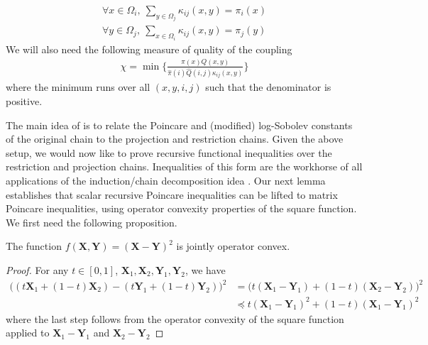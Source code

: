 \begin{align*}
  \forall x \in \Omega_i, \ \sum\limits_{y \in \Omega_j}\kappa_{ij}(x,y) = \pi_i(x)\\
  \forall y \in \Omega_j, \ \sum\limits_{x \in \Omega_i}\kappa_{ij}(x,y) = \pi_j(y)
\end{align*}
We will also need the following measure of quality of the coupling
\begin{align*}
  \chi = \min\bigg\{\frac{\pi(x)Q(x,y)}{\hat{\pi}(i)\hat{Q}(i,j)\kappa_{ij}(x,y)}\bigg\}
\end{align*}
where the minimum runs over all $(x,y,i,j)$ such that the denominator is positive.

The main idea of \cite{JSTV04} is to relate the Poincare and (modified) log-Sobolev constants of the original chain to the projection and restriction chains. Given the above setup, we would now like to prove recursive functional inequalities over the restriction and projection chains. Inequalities of this form are the workhorse of all applications of the induction/chain decomposition idea \cite{JSTV04}. Our next lemma establishes that scalar recursive Poincare inequalities can be lifted to matrix Poincare inequalities, using operator convexity properties of the square function. We first need the following proposition.
\begin{proposition}\label{prop:diffOC} The function $f(\mathbf{X},\mathbf{Y}) = (\mathbf{X}-\mathbf{Y})^2$ is jointly operator convex.
\end{proposition}
\begin{proof}
For any $t\in [0,1]$, $\mathbf{X}_1,\mathbf{X}_2,\mathbf{Y}_1,\mathbf{Y}_2$, we have
  \begin{align*}
    \big( (t \mathbf{X}_1 + (1-t)\mathbf{X}_2) - (t \mathbf{Y}_1 + (1-t)\mathbf{Y}_2)\big)^2&=\big( t (\mathbf{X}_1-\mathbf{Y}_1) + (1-t)(\mathbf{X}_2 -\mathbf{Y}_2)\big)^2\\
    &\preceq t(\mathbf{X}_1-\mathbf{Y}_1)^2+(1-t)(\mathbf{X}_1-\mathbf{Y}_1)^2
  \end{align*}
  where the last step follows from the operator convexity of the square function applied to $\mathbf{X}_1-\mathbf{Y}_1$ and $\mathbf{X}_2-\mathbf{Y}_2$
\end{proof}

